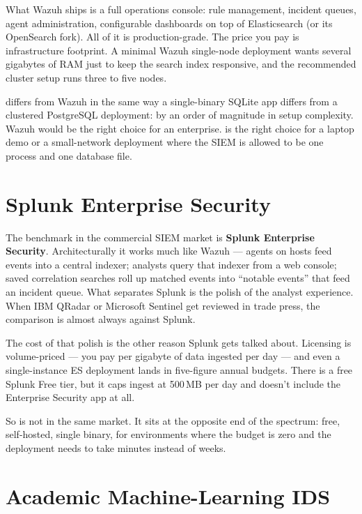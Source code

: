 What Wazuh ships is a full operations console: rule management,
incident queues, agent administration, configurable dashboards
on top of Elasticsearch (or its OpenSearch fork). All of it is
production-grade. The price you pay is infrastructure footprint.
A minimal Wazuh single-node deployment wants several gigabytes
of RAM just to keep the search index responsive, and the
recommended cluster setup runs three to five nodes.

\nidsname{} differs from Wazuh in the same way a single-binary
SQLite app differs from a clustered PostgreSQL deployment: by an
order of magnitude in setup complexity. Wazuh would be the right
choice for an enterprise. \nidsname{} is the right choice for a
laptop demo or a small-network deployment where the SIEM is allowed
to be one process and one database file.

\section{Splunk Enterprise Security}
\label{sec:rw-splunk}

The benchmark in the commercial SIEM market is
\textbf{Splunk Enterprise Security}. Architecturally it works
much like Wazuh --- agents on hosts feed events into a central
indexer; analysts query that indexer from a web console;
saved correlation searches roll up matched events into
``notable events'' that feed an incident queue. What separates
Splunk is the polish of the analyst experience. When IBM QRadar
or Microsoft Sentinel get reviewed in trade press, the comparison
is almost always against Splunk.

The cost of that polish is the other reason Splunk gets talked
about. Licensing is volume-priced --- you pay per gigabyte of
data ingested per day --- and even a single-instance ES
deployment lands in five-figure annual budgets. There is a free
Splunk Free tier, but it caps ingest at 500\,MB per day and
doesn't include the Enterprise Security app at all.

So \nidsname{} is not in the same market. It sits at the
opposite end of the spectrum: free, self-hosted, single binary,
for environments where the budget is zero and the deployment
needs to take minutes instead of weeks.

\section{Academic Machine-Learning IDS}
\label{sec:rw-ml-academia}

